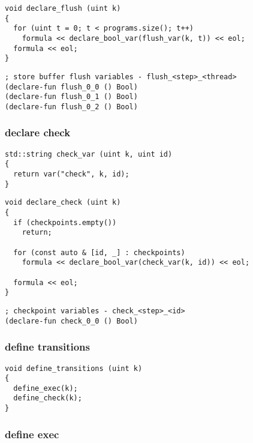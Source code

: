 \begin{lstlisting}[style=c++]
void declare_flush (uint k)
{
  for (uint t = 0; t < programs.size(); t++)
    formula << declare_bool_var(flush_var(k, t)) << eol;
  formula << eol;
}
\end{lstlisting}

\begin{lstlisting}[language=SMTLib]
; store buffer flush variables - flush_<step>_<thread>
(declare-fun flush_0_0 () Bool)
(declare-fun flush_0_1 () Bool)
(declare-fun flush_0_2 () Bool)
\end{lstlisting}

\subsubsection{declare check}

\begin{lstlisting}[style=c++]
std::string check_var (uint k, uint id)
{
  return var("check", k, id);
}
\end{lstlisting}

\begin{lstlisting}[style=c++]
void declare_check (uint k)
{
  if (checkpoints.empty())
    return;

  for (const auto & [id, _] : checkpoints)
    formula << declare_bool_var(check_var(k, id)) << eol;

  formula << eol;
}
\end{lstlisting}

\begin{lstlisting}[language=SMTLib]
; checkpoint variables - check_<step>_<id>
(declare-fun check_0_0 () Bool)
\end{lstlisting}

\subsubsection{define transitions}

\begin{lstlisting}[style=c++]
void define_transitions (uint k)
{
  define_exec(k);
  define_check(k);
}
\end{lstlisting}

\subsubsection{define exec}

